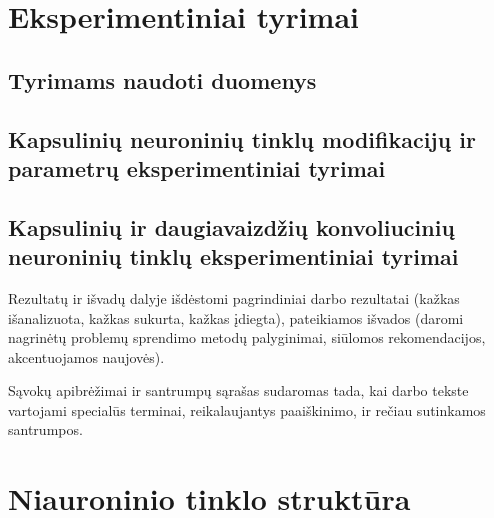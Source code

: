 \documentclass{VUMIFInfMagistrinis}
\begin{document}
\section{Eksperimentiniai tyrimai}

\subsection{Tyrimams naudoti duomenys}

\subsection{Kapsulinių neuroninių tinklų modifikacijų ir parametrų eksperimentiniai tyrimai}

\subsection{Kapsulinių ir daugiavaizdžių konvoliucinių neuroninių tinklų eksperimentiniai tyrimai}



Rezultatų ir išvadų dalyje išdėstomi pagrindiniai darbo rezultatai (kažkas
išanalizuota, kažkas sukurta, kažkas įdiegta), pateikiamos išvados (daromi
nagrinėtų problemų sprendimo metodų palyginimai, siūlomos rekomendacijos,
akcentuojamos naujovės).

\printbibliography[heading=bibintoc]  %

Sąvokų apibrėžimai ir santrumpų sąrašas sudaromas tada, kai darbo tekste
vartojami specialūs terminai, reikalaujantys paaiškinimo, ir rečiau sutinkamos
santrumpos.

\appendix  %

\section{Niauroninio tinklo struktūra}
\end{document}
